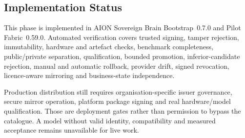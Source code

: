 \subsection{Implementation Status}

This phase is implemented in AION Sovereign Brain Bootstrap~0.7.0 and Pilot
Fabric~0.59.0.  Automated verification covers trusted signing, tamper rejection,
immutability, hardware and artefact checks, benchmark completeness, public/private
separation, qualification, bounded promotion, inferior-candidate rejection, manual and
automatic rollback, provider drift, signed revocation, licence-aware mirroring and
business-state independence.

Production distribution still requires organisation-specific issuer governance, secure
mirror operation, platform package signing and real hardware/model qualification.  Those
are deployment gates rather than permission to bypass the catalogue.  A model without
valid identity, compatibility and measured acceptance remains unavailable for live work.
